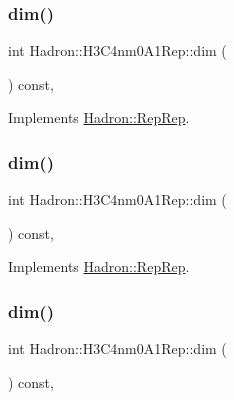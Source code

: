 \subsubsection{\texorpdfstring{dim()}{dim()}\hspace{0.1cm}{\footnotesize\ttfamily [3/5]}}
{\footnotesize\ttfamily int Hadron\+::\+H3\+C4nm0\+A1\+Rep\+::dim (\begin{DoxyParamCaption}{ }\end{DoxyParamCaption}) const\hspace{0.3cm}{\ttfamily [inline]}, {\ttfamily [virtual]}}



Implements \mbox{\hyperlink{structHadron_1_1RepRep_a92c8802e5ed7afd7da43ccfd5b7cd92b}{Hadron\+::\+Rep\+Rep}}.

\mbox{\label{structHadron_1_1H3C4nm0A1Rep_aeb79449c80ab770c5b96c8215d566f47}} 
\subsubsection{\texorpdfstring{dim()}{dim()}\hspace{0.1cm}{\footnotesize\ttfamily [4/5]}}
{\footnotesize\ttfamily int Hadron\+::\+H3\+C4nm0\+A1\+Rep\+::dim (\begin{DoxyParamCaption}{ }\end{DoxyParamCaption}) const\hspace{0.3cm}{\ttfamily [inline]}, {\ttfamily [virtual]}}



Implements \mbox{\hyperlink{structHadron_1_1RepRep_a92c8802e5ed7afd7da43ccfd5b7cd92b}{Hadron\+::\+Rep\+Rep}}.

\mbox{\label{structHadron_1_1H3C4nm0A1Rep_aeb79449c80ab770c5b96c8215d566f47}} 
\subsubsection{\texorpdfstring{dim()}{dim()}\hspace{0.1cm}{\footnotesize\ttfamily [5/5]}}
{\footnotesize\ttfamily int Hadron\+::\+H3\+C4nm0\+A1\+Rep\+::dim (\begin{DoxyParamCaption}{ }\end{DoxyParamCaption}) const\hspace{0.3cm}{\ttfamily [inline]}, {\ttfamily [virtual]}}



